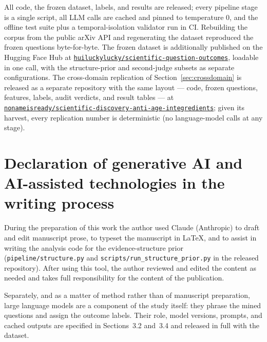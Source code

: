 \documentclass[11pt]{article}
\begin{document}
All code, the frozen dataset, labels, and results are released; every
pipeline stage is a single script, all LLM calls are cached and pinned
to temperature 0, and the offline test suite plus a temporal-isolation
validator run in CI. Rebuilding the corpus from the public arXiv API and
regenerating the dataset reproduced the frozen questions byte-for-byte.
The frozen dataset is additionally published on the Hugging Face Hub at
\href{https://huggingface.co/datasets/huiluckylucky/scientific-question-outcomes}{\texttt{huiluckylucky/scientific-question-outcomes}},
loadable in one call, with the structure-prior and second-judge subsets as
separate configurations.
The cross-domain replication of Section~\ref{sec:crossdomain} is
released as a separate repository with the same layout --- code, frozen
questions, features, labels, audit verdicts, and result tables --- at
\href{https://github.com/nonameisready/scientific-discovery-anti-age-integredients}{\texttt{nonameisready/scientific-discovery-anti-age-integredients}};
given its harvest, every replication number is deterministic (no
language-model calls at any stage).

\section*{Declaration of generative AI and AI-assisted technologies in the
writing process}

During the preparation of this work the author used Claude (Anthropic) to
draft and edit manuscript prose, to typeset the manuscript in \LaTeX, and to
assist in writing the analysis code for the evidence-structure prior
(\texttt{pipeline/structure.py} and \texttt{scripts/run\_structure\_prior.py}
in the released repository). After using this tool, the author reviewed and
edited the content as needed and takes full responsibility for the content of
the publication.

Separately, and as a matter of method rather than of manuscript preparation,
large language models are a component of the study itself: they phrase the
mined questions and assign the outcome labels. Their role, model versions,
prompts, and cached outputs are specified in Sections~3.2 and~3.4 and
released in full with the dataset.
\end{document}
